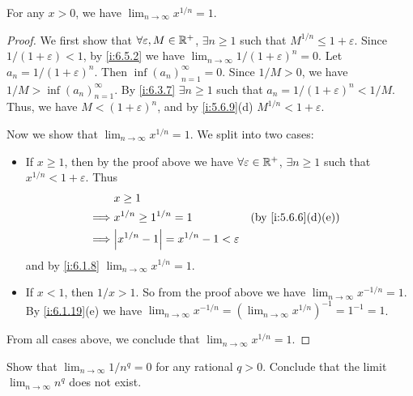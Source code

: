 \begin{lem}\label{i:6.5.3}
  For any \(x > 0\), we have \(\lim_{n \to \infty} x^{1 / n} = 1\).
\end{lem}

\begin{proof}
  We first show that \(\forall \varepsilon, M \in \mathbb{R}^+\), \(\exists n \geq 1\) such that \(M^{1 / n} \leq 1 + \varepsilon\).
  Since \(1 / (1 + \varepsilon) < 1\), by \cref{i:6.5.2} we have \(\lim_{n \to \infty} 1 / (1 + \varepsilon)^n = 0\).
  Let \(a_n = 1 / (1 + \varepsilon)^n\).
  Then \(\inf(a_n)_{n = 1}^\infty = 0\).
  Since \(1 / M > 0\), we have \(1 / M > \inf(a_n)_{n = 1}^\infty\).
  By \cref{i:6.3.7} \(\exists n \geq 1\) such that \(a_n = 1 / (1 + \varepsilon)^n < 1 / M\).
  Thus, we have \(M < (1 + \varepsilon)^n\), and by \cref{i:5.6.9}(d) \(M^{1 / n} < 1 + \varepsilon\).

  Now we show that \(\lim_{n \to \infty} x^{1 / n} = 1\).
  We split into two cases:
  \begin{itemize}
    \item If \(x \geq 1\), then by the proof above we have \(\forall \varepsilon \in \mathbb{R}^+\), \(\exists n \geq 1\) such that \(x^{1 / n} < 1 + \varepsilon\).
          Thus
          \begin{align*}
                     & x \geq 1                                                                 \\
            \implies & x^{1 / n} \geq 1^{1 / n} = 1                      &  & \by{i:5.6.6}[d,e] \\
            \implies & \abs{x^{1 / n} - 1} = x^{1 / n} - 1 < \varepsilon
          \end{align*}
          and by \cref{i:6.1.8} \(\lim_{n \to \infty} x^{1 / n} = 1\).
    \item If \(x < 1\), then \(1 / x > 1\).
          So from the proof above we have \(\lim_{n \to \infty} x^{-1 / n} = 1\).
          By \cref{i:6.1.19}(e) we have \(\lim_{n \to \infty} x^{-1 / n} = (\lim_{n \to \infty} x^{1 / n})^{-1} = 1^{-1} = 1\).
  \end{itemize}
  From all cases above, we conclude that \(\lim_{n \to \infty} x^{1 / n} = 1\).
\end{proof}

\exercisesection

\begin{ex}\label{i:ex:6.5.1}
  Show that \(\lim_{n \to \infty} 1 / n^q = 0\) for any rational \(q > 0\).
  Conclude that the limit \(\lim_{n \to \infty} n^q\) does not exist.
\end{ex}

